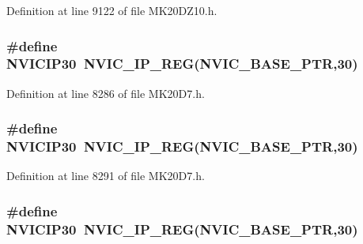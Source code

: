 Definition at line 9122 of file M\+K20\+D\+Z10.\+h.

\subsubsection[{\texorpdfstring{N\+V\+I\+C\+I\+P30}{NVICIP30}}]{\setlength{\rightskip}{0pt plus 5cm}\#define N\+V\+I\+C\+I\+P30~{\bf N\+V\+I\+C\+\_\+\+I\+P\+\_\+\+R\+EG}({\bf N\+V\+I\+C\+\_\+\+B\+A\+S\+E\+\_\+\+P\+TR},30)}\hypertarget{group___n_v_i_c___register___accessor___macros_gaeec87a6de84e4581c6a28a725206de8c}{}\label{group___n_v_i_c___register___accessor___macros_gaeec87a6de84e4581c6a28a725206de8c}


Definition at line 8286 of file M\+K20\+D7.\+h.

\subsubsection[{\texorpdfstring{N\+V\+I\+C\+I\+P30}{NVICIP30}}]{\setlength{\rightskip}{0pt plus 5cm}\#define N\+V\+I\+C\+I\+P30~{\bf N\+V\+I\+C\+\_\+\+I\+P\+\_\+\+R\+EG}({\bf N\+V\+I\+C\+\_\+\+B\+A\+S\+E\+\_\+\+P\+TR},30)}\hypertarget{group___n_v_i_c___register___accessor___macros_gaeec87a6de84e4581c6a28a725206de8c}{}\label{group___n_v_i_c___register___accessor___macros_gaeec87a6de84e4581c6a28a725206de8c}


Definition at line 8291 of file M\+K20\+D7.\+h.

\subsubsection[{\texorpdfstring{N\+V\+I\+C\+I\+P30}{NVICIP30}}]{\setlength{\rightskip}{0pt plus 5cm}\#define N\+V\+I\+C\+I\+P30~{\bf N\+V\+I\+C\+\_\+\+I\+P\+\_\+\+R\+EG}({\bf N\+V\+I\+C\+\_\+\+B\+A\+S\+E\+\_\+\+P\+TR},30)}\hypertarget{group___n_v_i_c___register___accessor___macros_gaeec87a6de84e4581c6a28a725206de8c}{}\label{group___n_v_i_c___register___accessor___macros_gaeec87a6de84e4581c6a28a725206de8c}


